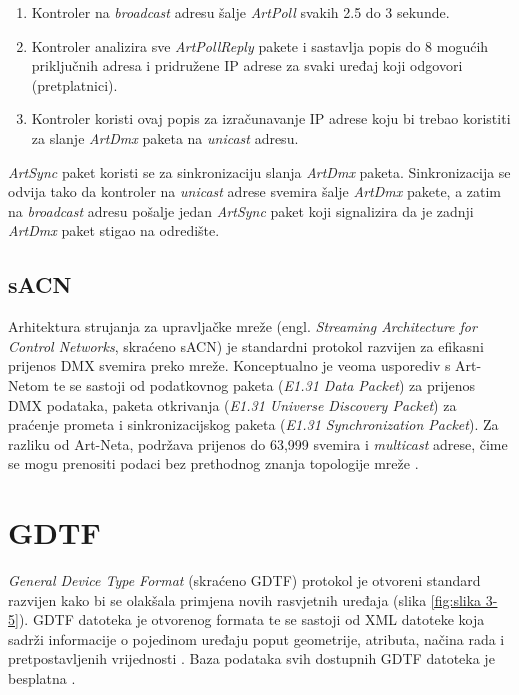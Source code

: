 \documentclass[times, utf8, zavrsni, numeric]{fer}
\begin{document}
\begin{enumerate}
	\item Kontroler na \emph{broadcast} adresu šalje \emph{ArtPoll} svakih 2.5 do 3 sekunde.
	\item Kontroler analizira sve \emph{ArtPollReply} pakete i sastavlja popis do 8 mogućih priključnih adresa i pridružene IP adrese za svaki uređaj koji odgovori (pretplatnici).
	\item Kontroler koristi ovaj popis za izračunavanje IP adrese koju bi trebao koristiti za slanje \emph{ArtDmx} paketa na \emph{unicast} adresu.
\end{enumerate}

\emph{ArtSync} paket koristi se za sinkronizaciju slanja \emph{ArtDmx} paketa. Sinkronizacija se odvija tako da kontroler na \emph{unicast} adrese svemira šalje \emph{ArtDmx} pakete, a zatim na \emph{broadcast} adresu pošalje jedan \emph{ArtSync} paket koji signalizira da je zadnji \emph{ArtDmx} paket stigao na odredište.

\pagebreak

\subsection{sACN}
Arhitektura strujanja za upravljačke mreže (engl. \emph{Streaming Architecture for Control Networks}, skraćeno sACN) je standardni protokol razvijen za efikasni prijenos DMX svemira preko mreže. Konceptualno je veoma usporediv s Art-Netom te se sastoji od podatkovnog paketa (\emph{E1.31 Data Packet}) za prijenos DMX podataka, paketa otkrivanja (\emph{E1.31 Universe Discovery Packet}) za praćenje prometa i sinkronizacijskog paketa (\emph{E1.31 Synchronization Packet}). Za razliku od Art-Neta, podržava prijenos do 63,999 svemira i \emph{multicast} adrese, čime se mogu prenositi podaci bez prethodnog znanja topologije mreže \cite{sACN}.

\section{GDTF}
\emph{General Device Type Format} (skraćeno GDTF) protokol je otvoreni standard razvijen kako bi se olakšala primjena novih rasvjetnih uređaja (slika \ref{fig:slika 3-5}). GDTF datoteka je otvorenog formata te se sastoji od XML datoteke koja sadrži informacije o pojedinom uređaju poput geometrije, atributa, načina rada i pretpostavljenih vrijednosti \cite{dmx_gdtf}. Baza podataka svih dostupnih GDTF datoteka je besplatna \cite{GDTF}.\\
\end{document}
